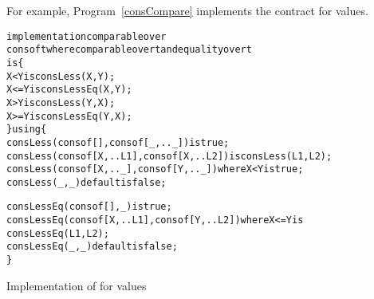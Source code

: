For example, Program~\vref{consCompare} implements the  contract for  values.
\begin{program}
\begin{alltt}
implementation comparable over
          cons of t where comparable over t and equality over t
  is\{
    X < Y is consLess(X,Y);
    X <= Y is consLessEq(X,Y);
    X > Y is consLess(Y,X);
    X >= Y is consLessEq(Y,X);
  \} using \{
    consLess(cons of [],cons of [\_ ,.. \_]) is true;
    consLess(cons of [X,..L1],cons of [X,..L2]) is consLess(L1,L2);
    consLess(cons of [X,..\_], cons of [Y,..\_]) where X<Y is true;
    consLess(_,_) default is false;
    
    consLessEq(cons of [],_) is true;
    consLessEq(cons of [X,..L1],cons of [Y,..L2]) where X<=Y is
      consLessEq(L1,L2);
    consLessEq(_,_) default is false;
  \}
\end{alltt}
\caption{Implementation of  for  values\label{consCompare}}
\end{program}



